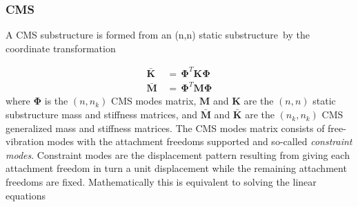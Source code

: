 \documentclass[11pt,openany,twoside]{book}
\numberwithin{equation}{section}		%
\newcommand{\Newterm}[1]{{\em #1}}	%
\newcommand{\Matrix}[1]{\boldsymbol{#1}}
\newcommand{\Ss}{substructure}
\begin{document}
\subsubsection{CMS}
\par
A CMS substructure is formed from an (n,n) static \Ss\
by the coordinate transformation

\begin{equation}\label{eqn:dsstrans}
\begin{split}
\Matrix{\bar{K}} & \, = \, \Matrix{\Phi}^T \Matrix{K} \Matrix{\Phi} \\
\Matrix{\bar{M}} & \, = \, \Matrix{\Phi}^T \Matrix{M} \Matrix{\Phi}
\end{split}
\end{equation}
where $\Matrix{\Phi}$ is the $(n,n_k )$ CMS modes matrix,
$\Matrix{M}$ and $\Matrix{K}$
are the $(n,n)$ static substructure mass and stiffness matrices, and
$\Matrix{\bar{M}}$ and $\Matrix{\bar{K}}$ are the $(n_k , n_k)$
CMS generalized mass and stiffness matrices.
The CMS modes matrix consists of free-vibration
modes with the attachment freedoms supported and so-called
\Newterm{constraint modes}.
Constraint modes are the displacement pattern resulting
from  giving each attachment freedom in turn a unit displacement while
the remaining attachment freedoms are fixed.
Mathematically this is equivalent to solving the linear equations
\end{document}

